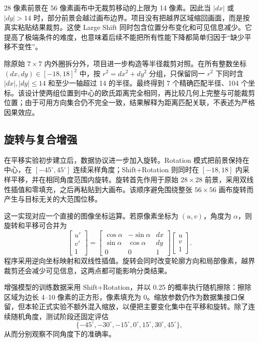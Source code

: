 28 像素前景在 56 像素画布中无裁剪移动的上限为 14 像素。因此当 $|dx|$ 或 $|dy|>14$ 时，部分前景会越过画布边界。项目没有把越界区域缩回画面，而是按真实粘贴结果裁剪。这使 Large Shift 同时包含位置分布变化和可见信息减少。它提高了极端条件的难度，也意味着后续不能把所有性能下降都简单归因于“缺少平移不变性”。

除原始 $7\times7$ 内外圈拆分外，项目进一步构造等半径裁剪对照。在所有整数坐标 $(dx,dy)\in[-18,18]^2$ 中，按 $r^2=dx^2+dy^2$ 分组，只保留同一 $r^2$ 下同时含 $|dx|,|dy|\leq14$ 和至少一轴超过 14 的半径。最终得到 7 个精确匹配半径、104 个坐标。该设计使两组位置到中心的欧氏距离完全相同，再比较几何上完整与可能裁剪位置；由于可用方向集合仍不完全一致，结果解释为距离匹配关联，不表述为严格因果效应。

\subsection{旋转与复合增强}

在平移实验初步建立后，数据协议进一步加入旋转。Rotation 模式把前景保持在中心，在 $[-45^\circ,45^\circ]$ 连续采样角度；Shift+Rotation 则同时在 $[-18,18]$ 内采样平移，并在相同角度范围内旋转。旋转首先作用于原始 $28\times28$ 前景，采用双线性插值和零填充，之后再粘贴到大画布。该顺序避免围绕整张 $56\times56$ 画布旋转而产生与目标无关的大范围位移。

这一实现对应一个直接的图像坐标运算。若原像素坐标为 $(u,v)$，角度为 $\alpha$，则旋转和平移可合并为
\[
  \begin{bmatrix}u'\\v'\\1\end{bmatrix}
  =
  \begin{bmatrix}
    \cos\alpha&-\sin\alpha&dx\\
    \sin\alpha& \cos\alpha&dy\\
    0&0&1
  \end{bmatrix}
  \begin{bmatrix}u\\v\\1\end{bmatrix}.
\]
程序采用逆向坐标映射和双线性插值。旋转会同时改变轮廓方向和局部像素，越界裁剪还会减少可见信息，这两点都可能影响分类结果。

增强模型的训练数据采用 Shift+Rotation，并以 0.25 的概率执行随机擦除：擦除区域为边长 4--10 像素的正方形，像素填充为 0。缩放参数仍作为数据集接口保留，但本轮正式实验不额外混入缩放，以便把主要变化集中在平移和旋转。除了连续随机角度，测试阶段还固定评估
\[
  \{-45^\circ,-30^\circ,-15^\circ,0^\circ,15^\circ,30^\circ,45^\circ\},
\]
从而分别观察不同角度下的准确率。

